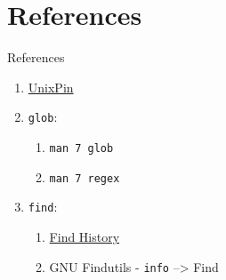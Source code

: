 \documentclass[11pt]{beamer}
\begin{document}
	\section{References}

		\begin{frame}{References}
			\begin{enumerate}
				\item \href{http://find.unixpin.com/}{UnixPin}
				\item {
						\texttt{glob}:
						\begin{enumerate}
							\item \texttt{man 7 glob}
							\item \texttt{man 7 regex}
						\end{enumerate}
					}
				\item {
						\texttt{find}:
						\begin{enumerate}
							\item \href{http://doc.cat-v.org/unix/find-history}{Find History}
							\item GNU Findutils - \texttt{info} --> Find
						\end{enumerate}
					}
			\end{enumerate}
		\end{frame}

\end{document}
